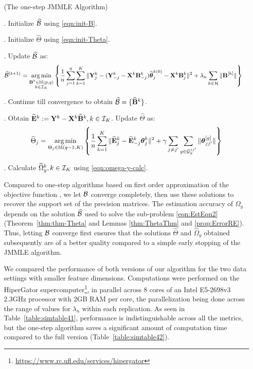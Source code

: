 \begin{Algorithm}
(The one-step JMMLE Algorithm)
\label{algo:jmmle-algo-1step}

. Initialize $\widehat {{\cal{B}}}$ using \eqref{eqn:init-B}.

. Initialize $\widehat \Theta$ using \eqref{eqn:init-Theta}.

. Update $\widehat {{\cal{B}}}$ as:
%
\begin{align*}
\widehat {{\cal{B}}}^{(t+1)} &= \operatorname*{arg\,min}_{\substack{{\mathbf{B}}^k \in {\mathbb{M}}(p,q)\\k \in {\cal{I}}_K}} \left\{ \frac{1}{n} \sum_{j=1}^q \sum_{k=1}^K \| {\mathbf{Y}}^k_j - ({\mathbf{Y}}_{-j}^k - {\mathbf{X}}^k {\mathbf{B}}_{-j}^k) \widehat {{\boldsymbol{\theta}}}_j^{k (0)} - {\mathbf{X}}^k {\mathbf{B}}_j^{k } \|^2
+ \lambda_n \sum_{h \in {\cal{H}}} \| {\mathbf{B}}^{[h]} \| \right\}
\end{align*}

. Continue till convergence to obtain $\widehat {{\cal{B}}} = \{ \widehat {{\mathbf{B}}}^k \}$.

. Obtain $\widehat {{\mathbf{E}}}^k := {\mathbf{Y}}^k - {\mathbf{X}}^k \widehat {{\mathbf{B}}}^k, k \in {\cal{I}}_K$. Update $\widehat \Theta$ as:
%
\begin{align*}
\widehat \Theta_j = \operatorname*{arg\,min}_{\Theta_j \in {\mathbb{M}}(q-1, K)}
\left\{ \frac{1}{n} \sum_{k=1}^K
\| \widehat {{\mathbf{E}}}_j^k - \widehat {{\mathbf{E}}}_{-j}^k {\boldsymbol{\theta}}_j^k \|^2
+ \gamma \sum_{j \neq j'} \sum_{g \in {\cal{G}}_y^{jj'}} \| {\boldsymbol{\theta}}_{jj'}^{[g]} \| \right\}
\end{align*}

. Calculate $\widehat \Omega_y^k, k \in {\cal{I}}_K$ using \eqref{eqn:omega-y-calc}.
\end{Algorithm}

Compared to one-step algorithms based on first order approximation of the objective function \citep{ZouLi08,Taddy17}, we let ${\cal{B}}$ converge completely, then use these solutions to recover the support set of the precision matrices. The estimation accuracy of $\Omega_y$ depends on the solution $\widehat {{\cal{B}}}$ used to solve the sub-problem \eqref{eqn:EstEqn2} (Theorem~\ref{thm:thm-Theta} and Lemmas \ref{thm:ThetaThm} and \ref{prop:ErrorRE}). Thus, letting ${\cal{B}}$ converge first ensures that the solutions $\widehat \Theta$ and $\widehat \Omega_y$ obtained subsequently are of a better quality compared to a simple early stopping of the JMMLE algorithm.

We compared the performance of both versions of our algorithm for the two data settings with smaller feature dimensions. Computations were performed on the HiperGator supercomputer\footnote{\url{https://www.rc.ufl.edu/services/hipergator}}, in parallel across 8 cores of an Intel E5-2698v3 2.3GHz processor with 2GB RAM per core, the parallelization being done across the range of values for $\lambda_n$ within each replication. As seen in Table~\ref{table:simtable41}, performance is  indistinguishable across all the metrics, but the one-step algorithm saves a significant amount of computation time compared to the full version (Table~\ref{table:simtable42}).

